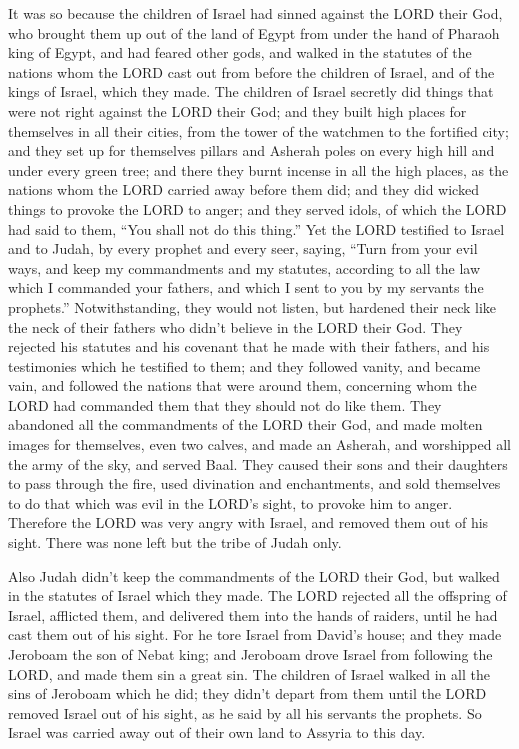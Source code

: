 It was so because the children of Israel had sinned against
the LORD their God, who brought them up out of the land of Egypt from
under the hand of Pharaoh king of Egypt, and had feared other gods,
 and walked in the statutes of the nations whom the LORD
cast out from before the children of Israel, and of the kings of Israel,
which they made.  The children of Israel secretly did things
that were not right against the LORD their God; and they built high
places for themselves in all their cities, from the tower of the
watchmen to the fortified city;  and they set up for
themselves pillars and Asherah poles on every high hill and under every
green tree;  and there they burnt incense in all the high
places, as the nations whom the LORD carried away before them did; and
they did wicked things to provoke the LORD to anger;  and
they served idols, of which the LORD had said to them, ``You shall not
do this thing.''  Yet the LORD testified to Israel and to
Judah, by every prophet and every seer, saying, ``Turn from your evil
ways, and keep my commandments and my statutes, according to all the law
which I commanded your fathers, and which I sent to you by my servants
the prophets.''  Notwithstanding, they would not listen,
but hardened their neck like the neck of their fathers who didn't
believe in the LORD their God.  They rejected his statutes
and his covenant that he made with their fathers, and his testimonies
which he testified to them; and they followed vanity, and became vain,
and followed the nations that were around them, concerning whom the LORD
had commanded them that they should not do like them.  They
abandoned all the commandments of the LORD their God, and made molten
images for themselves, even two calves, and made an Asherah, and
worshipped all the army of the sky, and served Baal.  They
caused their sons and their daughters to pass through the fire, used
divination and enchantments, and sold themselves to do that which was
evil in the LORD's sight, to provoke him to anger. 
Therefore the LORD was very angry with Israel, and removed them out of
his sight. There was none left but the tribe of Judah only.

 Also Judah didn't keep the commandments of the LORD their
God, but walked in the statutes of Israel which they made. 
The LORD rejected all the offspring of Israel, afflicted them, and
delivered them into the hands of raiders, until he had cast them out of
his sight.  For he tore Israel from David's house; and they
made Jeroboam the son of Nebat king; and Jeroboam drove Israel from
following the LORD, and made them sin a great sin.  The
children of Israel walked in all the sins of Jeroboam which he did; they
didn't depart from them  until the LORD removed Israel out
of his sight, as he said by all his servants the prophets. So Israel was
carried away out of their own land to Assyria to this day.

